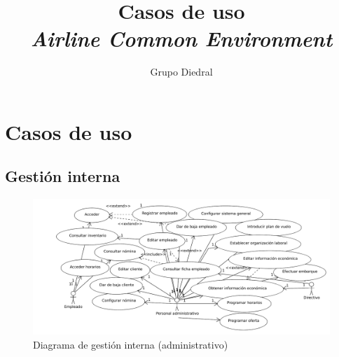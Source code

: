 \documentclass[11pt, a4paper, twoside]{report}
\title{Casos de uso\\\textsl{Airline Common Environment}}
\author{Grupo Diedral}
\begin{document}
	
	\tableofcontents
	\listoffigures
	\newpage


	\section{Casos de uso}
	
	\subsection{Gestión interna} \vspace{.5cm}
	\iniciarnumeraciondiedral

	\begin{figure}	%
		\hspace*{-2cm}\includegraphics[scale=.9]{diagramas/gestioninterna1.pdf}
		\caption{Diagrama de gestión interna (administrativo)}
	\end{figure}
\end{document}
